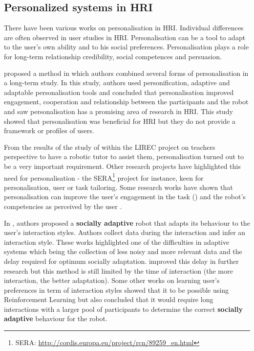 \documentclass[smallextended]{svjour3}
\begin{document}
\subsection{Personalized systems in HRI}
There have been various works on personalisation in HRI. 
Individual differences are often observed in user studies in HRI. 
Personalisation can be a tool to adapt to the user's own ability and to his social preferences.
Personalisation plays a role for long-term relationship credibility, social competences and persuasion. 

\cite{Lee2012} proposed a method in which authors combined several forms of personalisation in a long-term study. 
In this study, authors used personification, adaptive and adaptable personalisation tools and concluded that personalisation improved engagement, cooperation and relationship between the participants and the robot and saw personalisation has a promising area of research in HRI. 
This study showed that personalisation was beneficial for HRI but they do not provide a framework or profiles of users. 

From the results of the study of \cite{Jones2013} within the LIREC project on teachers perspective to have a robotic tutor to assist them, personalisation turned out to be a very important requirement. 
Other research projects have highlighted this need for personalisation - the SERA\footnote{SERA: \url{http://cordis.europa.eu/project/rcn/89259_en.html}} project for instance, keen for personalisation, user or task tailoring. 
Some research works have shown that personalisation can improve the user's engagement in the task (\cite{Corrigan2013}) and the robot's competencies as perceived  by the user \cite{Fasola2012a}.


In \cite{Francois2007a}, authors proposed a \textbf{socially adaptive} robot that adapts its behaviour to the user's interaction styles. Authors collect data during the interaction and infer an interaction style. 
These works highlighted one of the difficulties in adaptive systems which being the collection of less noisy and more relevant data and the delay required for optimum socially adaptation. 
\cite{Francois2009a} improved this delay in further research but this method is still limited by the time of interaction (the more interaction, the better adaptation). 
Some other works \cite{Castro-Gonzalez2011} on learning user's preferences in term of interaction styles showed that it to be possible using Reinforcement Learning but also concluded that it would require long interactions with a larger pool of participants to determine the correct \textbf{socially adaptive} behaviour for the robot. 
\end{document}
